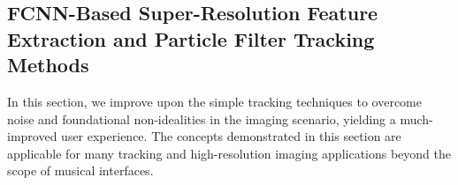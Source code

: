 \documentclass[10pt,journal,final]{IEEEtran}
\begin{document}



\subsection{FCNN-Based Super-Resolution Feature Extraction and Particle Filter Tracking Methods}
\label{subsec:enhanced_gesture_tracking}
In this section, we improve upon the simple tracking techniques to overcome noise and foundational non-idealities in the imaging scenario, yielding a much-improved user experience. 
The concepts demonstrated in this section are applicable for many tracking and high-resolution imaging applications beyond the scope of musical interfaces.
\end{document}
